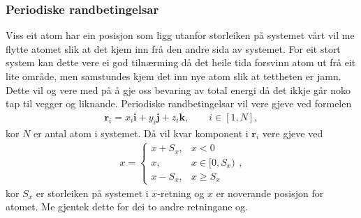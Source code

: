 \documentclass[12pt, a4paper]{article}
\theoremstyle{definition}
\newcommand{\vb}{\mathbf}
\begin{document}
        \subsubsection*{Periodiske randbetingelsar}
            Viss eit atom har ein 
            posisjon som ligg utanfor storleiken på systemet vårt vil me flytte atomet slik at det kjem inn frå den andre sida av systemet. For eit stort system kan dette 
            vere ei god tilnærming då det heile tida forsvinn atom ut frå eit lite område, men samstundes kjem det inn nye atom slik at tettheten er jamn. Dette vil og vere med
            på å gje oss bevaring av total energi då det ikkje går noko tap til vegger og liknande. Periodiske randbetingelsar vil vere gjeve ved formelen
            \begin{align*}
                \vb{r}_i = x_i\vb{i} + y_i\vb{j} + z_i\vb{k}, \qquad i \in [1, N],
            \end{align*}
            kor $N$ er antal atom i systemet. Då vil kvar komponent i $\vb{r}_i$ vere gjeve ved
            \begin{align*}
                x = 
                \begin{cases}
                    x + S_x, & x < 0 \\
                    x, & x \in [0, S_x) \\
                    x - S_x, & x \geq S_x
                \end{cases},
            \end{align*}
            kor $S_x$ er storleiken på systemet i $x$-retning og $x$ er noverande posisjon for atomet. Me gjentek dette for dei to andre retningane og.
\end{document}
